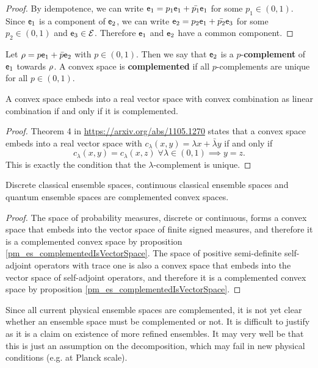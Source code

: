 \begin{proof}
	By idempotence, we can write $\ens_1 = p_1 \ens_1 + \bar{p_1} \ens_1$ for some $p_1 \in (0,1)$. Since $\ens_1$ is a component of $\ens_2$, we can write $\ens_2 = p_2 \ens_1 + \bar{p_2} \ens_3$ for some $p_2 \in (0, 1)$ and $\ens_3 \in \Ens$. Therefore $\ens_1$ and $\ens_2$ have a common component.
\end{proof}

\begin{defn}
	 Let $\ens[\rho] = p \ens_1 + \bar{p} \ens_2$ with $p \in (0,1)$. Then we say that $\ens_2$ is a $p$-\textbf{complement} of $\ens_1$ towards $\ens[\rho]$. A convex space is \textbf{complemented} if all $p$-complements are unique for all $p \in (0, 1)$.
\end{defn}

\begin{prop}\label{pm_es_complementedIsVectorSpace}
	A convex space embeds into a real vector space with convex combination as linear combination if and only if it is complemented.
\end{prop}
\begin{proof}
	Theorem 4 in \url{https://arxiv.org/abs/1105.1270} states that a convex space embeds into a real vector space with $c_\lambda(x,y) = \lambda x + \bar{\lambda}y$ if and only if
	$$ c_\lambda(x,y) = c_\lambda(x,z) \; \forall \lambda \in (0,1) \implies y = z.$$ This is exactly the condition that the $\lambda$-complement is unique.
\end{proof}

\begin{prop}
	Discrete classical ensemble spaces, continuous classical ensemble spaces and quantum ensemble spaces are complemented convex spaces.
\end{prop}

\begin{proof}
	The space of probability measures, discrete or continuous, forms a convex space that embeds into the vector space of finite signed measures, and therefore it is a complemented convex space by proposition \ref{pm_es_complementedIsVectorSpace}. The space of positive semi-definite self-adjoint operators with trace one is also a convex space that embeds into the vector space of self-adjoint operators, and therefore it is a complemented convex space by proposition \ref{pm_es_complementedIsVectorSpace}.
\end{proof}


\begin{remark}
	Since all current physical ensemble spaces are complemented, it is not yet clear whether an ensemble space must be complemented or not. It is difficult to justify as it is a claim on existence of more refined ensembles. It may very well be that this is just an assumption on the decomposition, which may fail in new physical conditions (e.g. at Planck scale).
\end{remark}


